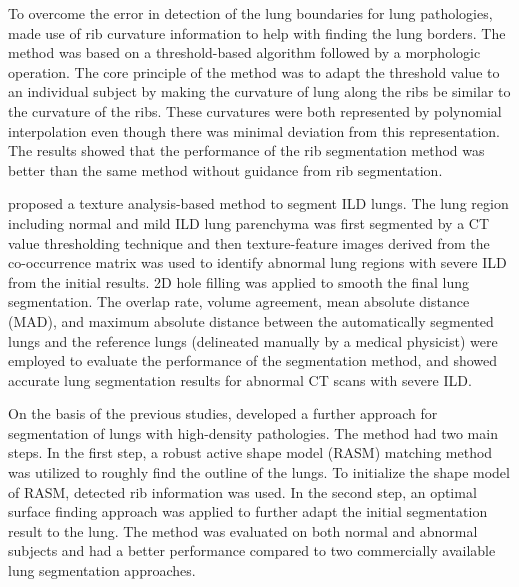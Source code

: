 To overcome the error in detection of the lung boundaries for lung pathologies, \cite{prasad2008automatic} made use of rib curvature information to help with finding the lung borders. The method was based on a threshold-based algorithm followed by a morphologic operation. The core principle of the method was to adapt the threshold value to an individual subject by making the curvature of lung along the ribs be similar to the curvature of the ribs. These curvatures were both represented by polynomial interpolation even though there was minimal deviation from this representation. The results showed that the performance of the rib segmentation method was better than the same method without guidance from rib segmentation.

\cite{wang2009automated} proposed a texture analysis-based method to segment ILD lungs. The lung region including normal and mild ILD lung parenchyma was first segmented by a CT value thresholding technique and then texture-feature images derived from the co-occurrence matrix was used to identify abnormal lung regions with severe ILD from the initial results. 2D hole filling was applied to smooth the final lung segmentation. The overlap rate, volume agreement, mean absolute distance (MAD), and maximum absolute distance between the automatically segmented lungs and the reference lungs (delineated manually by a medical physicist) were employed to evaluate the performance of the segmentation method, and showed accurate lung segmentation results for abnormal CT scans with severe ILD.

On the basis of the previous studies, \citep{sun2012automated} developed a further approach for segmentation of lungs with high-density pathologies. The method had two main steps. In the first step, a robust active shape model (RASM) matching method was utilized to roughly find the outline of the lungs. To initialize the shape model of RASM, detected rib information was used. In the second step, an optimal surface finding approach was applied to further adapt the initial segmentation result to the lung. The method was evaluated on both normal and abnormal subjects and had a better performance compared to two commercially available lung segmentation approaches.
